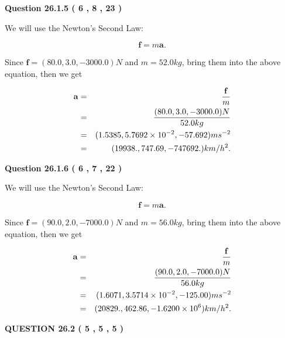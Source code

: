 \documentclass[12pt]{article}
\begin{document}
 
 
 
  
\vspace{0.2in}
  
{\textbf{\Large{Question
26.1.5 
 (           6 ,           8 ,          23 )
}}}
  
  
 
 

We will use the Newton's Second Law:
 
\[
\mathbf{f}=m\mathbf{a}.
\]
 
Since $\mathbf{f}=( %
80.0,  %
3.0,  %
-3000.0 )N$
and $m= %
52.0kg$, bring them into the above equation, then we get
 
\begin{eqnarray*}
\mathbf{a}&=&\frac{\mathbf{f}}m  \\
&=&\frac{(
80.0 ,
3.0 ,
-3000.0 )N
}{ %
52.0 kg}  \\
&=&(
1.5385 ,
5.7692 \times 10^{-2},
-57.692
)ms^{-2} \\
&=&(
19938. ,
747.69 ,
-747692.
)km/h^2.
\end{eqnarray*}
 
 
 
  
\vspace{0.2in}
  
{\textbf{\Large{Question
26.1.6 
 (           6 ,           7 ,          22 )
}}}
  
  
 
 

We will use the Newton's Second Law:
 
\[
\mathbf{f}=m\mathbf{a}.
\]
 
Since $\mathbf{f}=( %
90.0,  %
2.0,  %
-7000.0 )N$
and $m= %
56.0 kg$, bring them into the above equation, then we get
 
\begin{eqnarray*}
\mathbf{a}&=&\frac{\mathbf{f}}m  \\
&=&\frac{(
90.0 ,
2.0 ,
-7000.0 )N
}{ %
56.0 kg}  \\
&=&(
1.6071 ,
3.5714 \times 10^{-2},
-125.00
)ms^{-2} \\
&=&(
20829. ,
462.86 ,
-1.6200 \times 10^{6}
)km/h^2.
\end{eqnarray*}
 
 
 
  
\vspace{0.2in}
  
{\textbf{\Large{QUESTION
26.2 
 (           5 ,           5 ,           5 )
}}}
  
  
  
\end{document}
